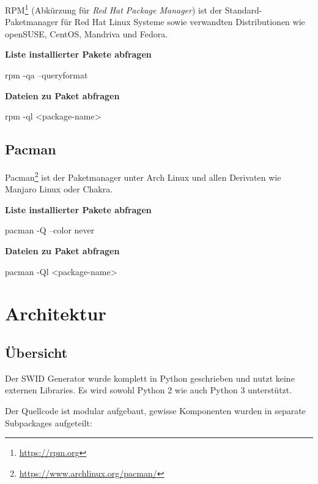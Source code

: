 RPM\footnote{\url{https://rpm.org}} (Abkürzung für \textit{Red Hat Package
Manager}) ist der Standard-Paketmanager für Red Hat Linux Systeme sowie
verwandten Distributionen wie openSUSE, CentOS, Mandriva und Fedora.

\textbf{Liste installierter Pakete abfragen}

\begin{bashcode}
rpm -qa --queryformat %
\end{bashcode}

\textbf{Dateien zu Paket abfragen}

\begin{bashcode}
rpm -ql <package-name>
\end{bashcode}


\subsection{Pacman}

Pacman\footnote{\url{https://www.archlinux.org/pacman/}} ist der Paketmanager
unter Arch Linux und allen Derivaten wie Manjaro Linux oder Chakra.

\textbf{Liste installierter Pakete abfragen}

\begin{bashcode}
pacman -Q --color never
\end{bashcode}

\textbf{Dateien zu Paket abfragen}

\begin{bashcode}
pacman -Ql <package-name>
\end{bashcode}



\section{Architektur}

\subsection{Übersicht}

Der SWID Generator wurde komplett in Python geschrieben und nutzt keine externen
Libraries. Es wird sowohl Python 2 wie auch Python 3 unterstützt.

Der Quellcode ist modular aufgebaut, gewisse Komponenten wurden in separate
Subpackages aufgeteilt:

